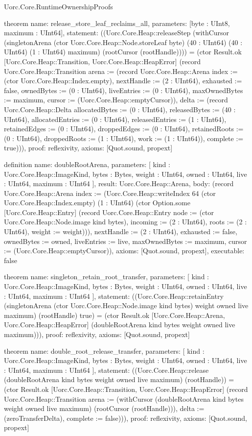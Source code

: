 \begin{lexlean}{Uorc.Core.RuntimeOwnershipProofs}
\begin{semanticmodule}
theorem{
  name: release_store_leaf_reclaims_all,
  parameters: [byte : UInt8, maximum : UInt64],
  statement: ((Uorc.Core.Heap::releaseStep (withCursor (singletonArena (ctor Uorc.Core.Heap::Node.storeLeaf byte) (40 : UInt64) (40 : UInt64) (1 : UInt64) maximum) (rootCursor (rootHandle)))) = (ctor Result.ok [Uorc.Core.Heap::Transition, Uorc.Core.Heap::HeapError] (record Uorc.Core.Heap::Transition {arena := (record Uorc.Core.Heap::Arena {index := (ctor Uorc.Core.Heap::Index.empty), nextHandle := (2 : UInt64), exhausted := false, ownedBytes := (0 : UInt64), liveEntries := (0 : UInt64), maxOwnedBytes := maximum, cursor := (Uorc.Core.Heap::emptyCursor)}), delta := (record Uorc.Core.Heap::Delta {allocatedBytes := (0 : UInt64), releasedBytes := (40 : UInt64), allocatedEntries := (0 : UInt64), releasedEntries := (1 : UInt64), retainedEdges := (0 : UInt64), droppedEdges := (0 : UInt64), retainedRoots := (0 : UInt64), droppedRoots := (1 : UInt64), work := (1 : UInt64)}), complete := true}))),
  proof: reflexivity{},
  axioms: [Quot.sound, propext]
}

definition{
  name: doubleRootArena,
  parameters: [
    kind : Uorc.Core.Heap::ImageKind,
    bytes : Bytes,
    weight : UInt64,
    owned : UInt64,
    live : UInt64,
    maximum : UInt64
  ],
  result: Uorc.Core.Heap::Arena,
  body: (record Uorc.Core.Heap::Arena {index := (Uorc.Core.Heap::writeIndex 64 (ctor Uorc.Core.Heap::Index.empty) (1 : UInt64) (ctor Option.some [Uorc.Core.Heap::Entry] (record Uorc.Core.Heap::Entry {node := (ctor Uorc.Core.Heap::Node.image kind bytes), incoming := (2 : UInt64), roots := (2 : UInt64), weight := weight}))), nextHandle := (2 : UInt64), exhausted := false, ownedBytes := owned, liveEntries := live, maxOwnedBytes := maximum, cursor := (Uorc.Core.Heap::emptyCursor)}),
  axioms: [Quot.sound, propext],
  executable: false
}

theorem{
  name: singleton_retain_root_transfer,
  parameters: [
    kind : Uorc.Core.Heap::ImageKind,
    bytes : Bytes,
    weight : UInt64,
    owned : UInt64,
    live : UInt64,
    maximum : UInt64
  ],
  statement: ((Uorc.Core.Heap::retainEntry (singletonArena (ctor Uorc.Core.Heap::Node.image kind bytes) weight owned live maximum) (rootHandle) true) = (ctor Result.ok [Uorc.Core.Heap::Arena, Uorc.Core.Heap::HeapError] (doubleRootArena kind bytes weight owned live maximum))),
  proof: reflexivity{},
  axioms: [Quot.sound, propext]
}

theorem{
  name: double_root_release_transfer,
  parameters: [
    kind : Uorc.Core.Heap::ImageKind,
    bytes : Bytes,
    weight : UInt64,
    owned : UInt64,
    live : UInt64,
    maximum : UInt64
  ],
  statement: ((Uorc.Core.Heap::release (doubleRootArena kind bytes weight owned live maximum) (rootHandle)) = (ctor Result.ok [Uorc.Core.Heap::Transition, Uorc.Core.Heap::HeapError] (record Uorc.Core.Heap::Transition {arena := (withCursor (doubleRootArena kind bytes weight owned live maximum) (rootCursor (rootHandle))), delta := (zeroTransferDelta), complete := false}))),
  proof: reflexivity{},
  axioms: [Quot.sound, propext]
}


\end{semanticmodule}
\end{lexlean}
